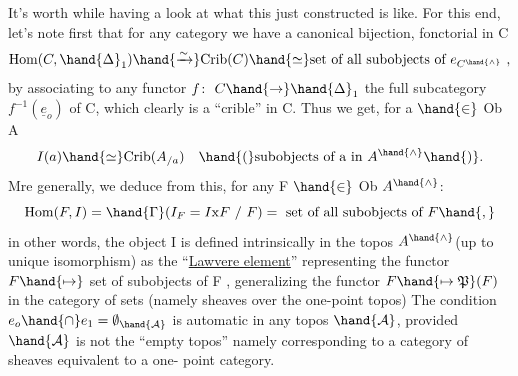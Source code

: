 It's worth while having a look at what this  just constructed is
like.  For this end,  let's note first that for any category\hand{,} we have
a canonical bijection,  fonctorial in C
\[ \mathrm{Hom}(C, \hand{\Delta}_1) \hand{\xrightarrow{\sim}} \mathrm{Crib}(C) \hand{\simeq} \text{set of all subobjects of } e_{C^{\hand{\wedge}}} \ , \]
by associating to any functor $f\colon\ C \hand{\to} \hand{\Delta}_1$  the full subcategory $f^{-1}(\underline{e}_o)$ of
C,  which clearly is a ``crible''\inserted{[=sieve]} in C.  Thus we get,  for a $\hand{\in}$ Ob A
\[ I(a) \hand{\simeq} \mathrm{Crib}(A_{/a}) \quad \hand{(}\text{subobjects of a in } A^{\hand{\wedge}}\hand{)}. \]
Mre generally,  we deduce from this,  for any F $\hand{\in}$ Ob $A^{\hand{\wedge}}$:
\[ \mathrm{Hom}(F,I) = \hand{\Gamma}(I_F = I\mathrm{x}F \ / \ F) = \text{ set of all subobjects of } F\hand{,} \]
in other words, the object I is defined intrinsically in the topos $A^{\hand{\wedge}}$\hand{/}(up
to unique isomorphism)  as the ``\uline{Lawvere element}''  representing the functor
$F \hand{\mapsto}$ set of subobjects of F ,  generalizing the functor  $F \hand{\mapsto \mathfrak{P}}(F)$ in the
category of sets (namely sheaves over the one-point topos)\hand{,}  The  condition
$e_o \hand{\cap} e_1 = \emptyset_{\hand{\mathcal{A}}}$  is automatic in any topos $\hand{\mathcal{A}}$, provided $\hand{\mathcal{A}}$ is not the ``empty
topos''  namely corresponding to a category of sheaves equivalent to a one-%
point category. 
